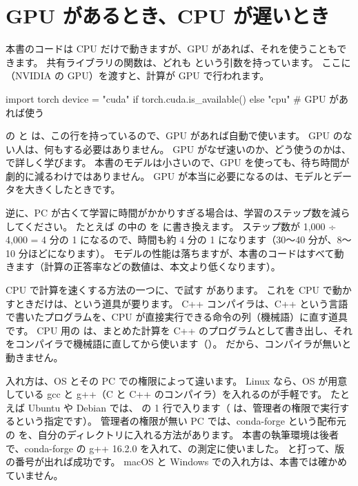 \section{GPU があるとき、CPU が遅いとき}\label{sec:setup-device}

本書のコードは CPU だけで動きますが、GPU があれば、それを使うこともできます。
共有ライブラリの関数は、どれも  という引数を持っています。
ここに （NVIDIA の GPU）を渡すと、計算が GPU で行われます。

\begin{pycode}
import torch
device = "cuda" if torch.cuda.is_available() else "cpu"   # GPU があれば使う
\end{pycode}

の  と  は、この行を持っているので、GPU があれば自動で使います。
GPU のない人は、何もする必要はありません。
GPU がなぜ速いのか、どう使うのかは、で詳しく学びます。
本書のモデルは小さいので、GPU を使っても、待ち時間が劇的に減るわけではありません。
GPU が本当に必要になるのは、モデルとデータを大きくしたときです。

逆に、PC が古くて学習に時間がかかりすぎる場合は、学習のステップ数を減らしてください。
たとえば  の中の  を  に書き換えます。
ステップ数が 1,000 ÷ 4,000 = 4 分の 1 になるので、時間も約 4 分の 1 になります（30〜40 分が、8〜10 分ほどになります）。
モデルの性能は落ちますが、本書のコードはすべて動きます（計算の正答率などの数値は、本文より低くなります）。

CPU で計算を速くする方法の一つに、で試す  があります。
これを CPU で動かすときだけは、という道具が要ります。
C++ コンパイラは、C++ という言語で書いたプログラムを、CPU が直接実行できる命令の列（機械語）に直す道具です。
CPU 用の  は、まとめた計算を C++ のプログラムとして書き出し、それをコンパイラで機械語に直してから使います（）。
だから、コンパイラが無いと動きません。

入れ方は、OS とその PC での権限によって違います。
Linux なら、OS が用意している gcc と g++（C と C++ のコンパイラ）を入れるのが手軽です。
たとえば Ubuntu や Debian では、 の 1 行で入ります（ は、管理者の権限で実行するという指定です）。
管理者の権限が無い PC では、conda-forge という配布元の  を、自分のディレクトリに入れる方法があります。
本書の執筆環境は後者で、conda-forge の g++ 16.2.0 を入れて、の測定に使いました。
 と打って、版の番号が出れば成功です。
macOS と Windows での入れ方は、本書では確かめていません。

